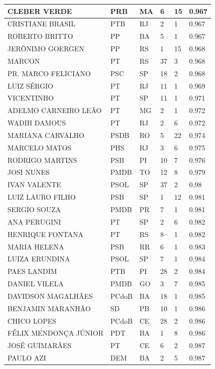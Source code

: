 \begin{apendicesenv}
\begin{longtable}{|L{4cm}|C{2cm}|C{1cm}|C{2cm}|C{1cm}|C{2cm}|}
CLEBER VERDE & PRB & MA & 6 & 15 & 0.967 \\ \hline
CRISTIANE BRASIL & PTB & RJ & 2 & 1 & 0.967 \\ \hline
ROBERTO BRITTO & PP & BA & 5 & 1 & 0.967 \\ \hline
JERÔNIMO GOERGEN & PP & RS & 1 & 15 & 0.968 \\ \hline
MARCON & PT & RS & 37 & 3 & 0.968 \\ \hline
PR. MARCO FELICIANO & PSC & SP & 18 & 2 & 0.968 \\ \hline
LUIZ SÉRGIO & PT & RJ & 11 & 1 & 0.969 \\ \hline
VICENTINHO & PT & SP & 11 & 1 & 0.971 \\ \hline
ADELMO CARNEIRO LEÃO & PT & MG & 2 & 1 & 0.972 \\ \hline
WADIH DAMOUS & PT & RJ & 2 & 6 & 0.972 \\ \hline
MARIANA CARVALHO & PSDB & RO & 5 & 22 & 0.974 \\ \hline
MARCELO MATOS & PHS & RJ & 3 & 6 & 0.975 \\ \hline
RODRIGO MARTINS & PSB & PI & 10 & 7 & 0.976 \\ \hline
JOSI NUNES & PMDB & TO & 12 & 8 & 0.979 \\ \hline
IVAN VALENTE & PSOL & SP & 37 & 2 & 0.98 \\ \hline
LUIZ LAURO FILHO & PSB & SP & 1 & 12 & 0.981 \\ \hline
SERGIO SOUZA & PMDB & PR & 7 & 1 & 0.981 \\ \hline
ANA PERUGINI & PT & SP & 2 & 6 & 0.982 \\ \hline
HENRIQUE FONTANA & PT & RS & 8 & 1 & 0.982 \\ \hline
MARIA HELENA & PSB & RR & 6 & 1 & 0.983 \\ \hline
LUIZA ERUNDINA & PSOL & SP & 7 & 1 & 0.984 \\ \hline
PAES LANDIM & PTB & PI & 28 & 2 & 0.984 \\ \hline
DANIEL VILELA & PMDB & GO & 3 & 7 & 0.985 \\ \hline
DAVIDSON MAGALHÃES & PCdoB & BA & 18 & 1 & 0.985 \\ \hline
BENJAMIN MARANHÃO & SD & PB & 10 & 1 & 0.986 \\ \hline
CHICO LOPES & PCdoB & CE & 28 & 2 & 0.986 \\ \hline
FÉLIX MENDONÇA JÚNIOR & PDT & BA & 1 & 8 & 0.986 \\ \hline
JOSÉ GUIMARÃES & PT & CE & 6 & 2 & 0.987 \\ \hline
PAULO AZI & DEM & BA & 2 & 5 & 0.987 \\ \hline

\end{longtable}
\end{apendicesenv}
